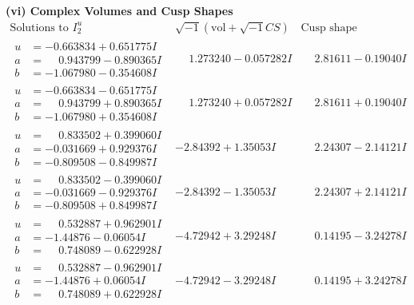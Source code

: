 \documentclass[1p]{elsarticle_modified}
\theoremstyle{definition}
\newcommand{\I}{\sqrt{-1}}
\begin{document}
\newpage\flushleft \textbf{(vi) Complex Volumes and Cusp Shapes}
$$\begin{array}{c|c|c}  
\text{Solutions to }I^u_{2}& \I (\text{vol} + \sqrt{-1}CS) & \text{Cusp shape}\\
 \hline 
\begin{aligned}
u &= -0.663834 + 0.651775 I \\
a &= \phantom{-}0.943799 - 0.890365 I \\
b &= -1.067980 - 0.354608 I\end{aligned}
 & \phantom{-}1.273240 - 0.057282 I & \phantom{-}2.81611 - 0.19040 I \\ \hline\begin{aligned}
u &= -0.663834 - 0.651775 I \\
a &= \phantom{-}0.943799 + 0.890365 I \\
b &= -1.067980 + 0.354608 I\end{aligned}
 & \phantom{-}1.273240 + 0.057282 I & \phantom{-}2.81611 + 0.19040 I \\ \hline\begin{aligned}
u &= \phantom{-}0.833502 + 0.399060 I \\
a &= -0.031669 + 0.929376 I \\
b &= -0.809508 - 0.849987 I\end{aligned}
 & -2.84392 + 1.35053 I & \phantom{-}2.24307 - 2.14121 I \\ \hline\begin{aligned}
u &= \phantom{-}0.833502 - 0.399060 I \\
a &= -0.031669 - 0.929376 I \\
b &= -0.809508 + 0.849987 I\end{aligned}
 & -2.84392 - 1.35053 I & \phantom{-}2.24307 + 2.14121 I \\ \hline\begin{aligned}
u &= \phantom{-}0.532887 + 0.962901 I \\
a &= -1.44876 - 0.06054 I \\
b &= \phantom{-}0.748089 - 0.622928 I\end{aligned}
 & -4.72942 + 3.29248 I & \phantom{-}0.14195 - 3.24278 I \\ \hline\begin{aligned}
u &= \phantom{-}0.532887 - 0.962901 I \\
a &= -1.44876 + 0.06054 I \\
b &= \phantom{-}0.748089 + 0.622928 I\end{aligned}
 & -4.72942 - 3.29248 I & \phantom{-}0.14195 + 3.24278 I \\ \hline\begin{aligned}

\end{aligned}
\end{array}$$
\end{document}
